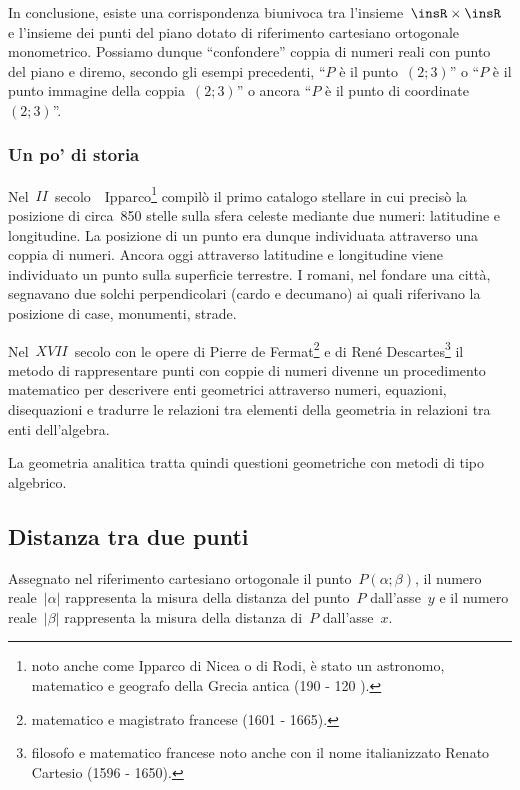 In conclusione, esiste una corrispondenza biunivoca tra l'insieme~$\insR\times \insR$ e l'insieme dei punti del piano dotato di
riferimento cartesiano ortogonale monometrico. Possiamo dunque ``confondere'' coppia di numeri reali con punto del piano e
diremo, secondo gli esempi precedenti, ``$P$ è il punto~$(2;3)$'' o ``$P$
è il punto immagine della coppia~$(2;3)$'' o ancora ``$P$ è il punto di coordinate~$(2;3)$''.

\subsubsection*{Un po' di storia}
Nel~$II$~secolo~\aC\ Ipparco\footnote{noto anche come Ipparco di Nicea o di Rodi, è stato un astronomo, matematico e geografo della Grecia antica (190 \aC - 120 \aC).} compilò il primo catalogo stellare in cui precisò la posizione di circa~850 stelle sulla sfera celeste
mediante due numeri: latitudine e longitudine. La posizione di un punto era dunque individuata attraverso una coppia di numeri.
Ancora oggi attraverso latitudine e longitudine viene individuato un punto sulla superficie terrestre.
I romani, nel fondare una città, segnavano due solchi perpendicolari (cardo e decumano) ai quali riferivano la posizione di case, monumenti, strade.

Nel~$XVII$~secolo con le opere di Pierre de Fermat\footnote{matematico e magistrato francese (1601 - 1665).} e di René Descartes\footnote{filosofo e matematico francese noto anche con il nome italianizzato Renato Cartesio (1596 - 1650).} il metodo di rappresentare punti con coppie di numeri divenne
un procedimento matematico per descrivere enti geometrici attraverso numeri, equazioni, disequazioni e tradurre le relazioni
tra elementi della geometria in relazioni tra enti dell'algebra.

La geometria analitica tratta quindi questioni geometriche con metodi di tipo algebrico.

\vspazio\ovalbox{\risolvi \ref{ese:8.20}}

\subsection{Distanza tra due punti}
Assegnato nel riferimento cartesiano ortogonale il punto~$P(\alpha; \beta)$, il numero reale~$|\alpha|$ rappresenta la
misura della distanza del punto~$P$ dall'asse~$y$ e il numero reale~$|\beta|$ rappresenta la misura della distanza di~$P$
dall'asse~$x$.

